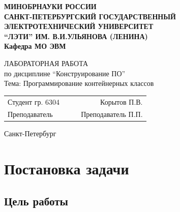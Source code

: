 \documentclass[a4paper, 14pt]{extarticle}
\begin{document}
    
\begin{titlepage}
    \centering
    {\bfseries
        \uppercase{%
            Минобрнауки России \\
            Санкт-Петербургский государственный \\
            Электротехнический университет \\
            \enquote{ЛЭТИ} им. В.И.Ульянова (Ленина)\\
        }
        Кафедра МО ЭВМ

        \vspace{\fill}
        \uppercase{Лабораторная работа} \\
        по дисциплине \enquote{Конструирование ПО} \\
        Тема: Программирование контейнерных классов
    }

    \vspace{\fill}
    \begin{tabularx}{0.8\textwidth}{l X c r}
        Студент гр. 6304 & & \underline{\hspace{3cm}} & Корытов П.В.\\
        Преподаватель & & \underline{\hspace{3cm}} & Преподаватель П.П. 
    \end{tabularx}

    \vspace{1cm}
    Санкт-Петербург \\
    \the\year{}
\end{titlepage}
\newpage
\begingroup\singlespacing{}
\tableofcontents{}
\endgroup
\newpage

\section{Постановка задачи}
\subsection{Цель работы}
\lipsum[1]
\end{document}
